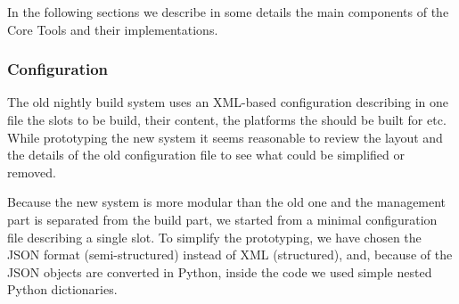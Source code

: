 \documentclass{lhcbnote}
\begin{document}
In the following sections we describe in some details the main components of the
Core Tools and their implementations.

\subsubsection{Configuration}
The old nightly build system uses an XML-based configuration describing in one
file the slots to be build, their content, the platforms the should be built for
etc.  While prototyping the new system it seems reasonable to review the layout
and the details of the old configuration file to see what could be simplified or
removed.

Because the new system is more modular than the old one and the management part
is separated from the build part, we started from a minimal configuration file
describing a single slot.  To simplify the prototyping, we have chosen the JSON
format (semi-structured) instead of XML (structured), and, because of the JSON
objects are converted in Python, inside the code we used simple nested Python
dictionaries.
\end{document}
